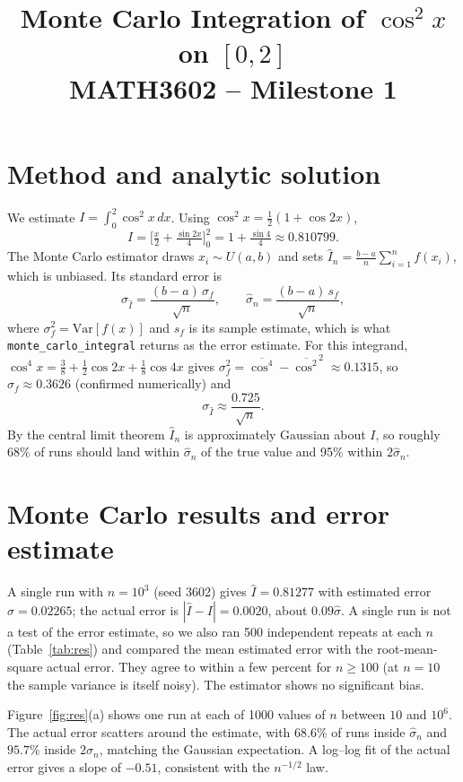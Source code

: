 \documentclass[10pt,a4paper]{article}
\title{\vspace{-1.2cm}\textbf{Monte Carlo Integration of $\cos^2 x$ on $[0,2]$}\\[2pt]
\large MATH3602 -- Milestone 1\vspace{-0.3cm}}
\date{}
\begin{document}
\maketitle

\section{Method and analytic solution}
We estimate $I=\int_0^2\cos^2 x\,dx$. Using $\cos^2x=\tfrac12(1+\cos 2x)$,
\begin{equation}
I=\Big[\tfrac{x}{2}+\tfrac{\sin 2x}{4}\Big]_0^2 = 1+\tfrac{\sin 4}{4}\approx 0.810799 .
\end{equation}
The Monte Carlo estimator draws $x_i\sim U(a,b)$ and sets
$\hat I_n=\frac{b-a}{n}\sum_{i=1}^n f(x_i)$, which is unbiased. Its standard error is
\begin{equation}
\sigma_{\hat I}=\frac{(b-a)\,\sigma_f}{\sqrt n},\qquad
\hat\sigma_n=\frac{(b-a)\,s_f}{\sqrt n},
\end{equation}
where $\sigma_f^2=\mathrm{Var}[f(x)]$ and $s_f$ is its sample estimate, which is what
\texttt{monte\_carlo\_integral} returns as the error estimate. For this integrand, $\cos^4x=\tfrac38+\tfrac12\cos2x+\tfrac18\cos4x$ gives
$\sigma_f^2=\overline{\cos^4}-\overline{\cos^2}^{\,2}\approx0.1315$, so $\sigma_f\approx0.3626$ (confirmed numerically) and
\begin{equation}
\sigma_{\hat I}\approx \frac{0.725}{\sqrt n}.
\end{equation}
By the central limit theorem $\hat I_n$ is approximately Gaussian about $I$, so roughly 68\% of runs should land within $\hat\sigma_n$ of the true value and 95\% within $2\hat\sigma_n$.

\section{Monte Carlo results and error estimate}
A single run with $n=10^3$ (seed 3602) gives $\hat I=0.81277$ with estimated error $\hat\sigma=0.02265$; the actual error is $|\hat I-I|=0.0020$, about $0.09\hat\sigma$. A single run is not a test of the error estimate, so we also ran 500 independent repeats at each $n$ (Table~\ref{tab:res}) and compared the mean estimated error with the root-mean-square actual error. They agree to within a few percent for $n\ge100$ (at $n=10$ the sample variance is itself noisy). The estimator shows no significant bias.

Figure~\ref{fig:res}(a) shows one run at each of 1000 values of $n$ between $10$ and $10^6$. The actual error scatters around the estimate, with $68.6\%$ of runs inside $\hat\sigma_n$ and $95.7\%$ inside $2\hat\sigma_n$, matching the Gaussian expectation. A log--log fit of the actual error gives a slope of $-0.51$, consistent with the $n^{-1/2}$ law.
\end{document}
